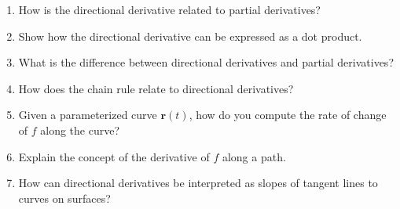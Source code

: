 \begin{enumerate}
  \item How is the directional derivative related to partial derivatives?
  \item Show how the directional derivative can be expressed as a dot product.
  \item What is the difference between directional derivatives and partial derivatives?
  \item How does the chain rule relate to directional derivatives?
  \item Given a parameterized curve \(\mathbf{r}(t)\), how do you compute the rate of change of \(f\) along the curve?
  \item Explain the concept of the derivative of \(f\) along a path.
  \item How can directional derivatives be interpreted as slopes of tangent lines to curves on surfaces?
\end{enumerate}
